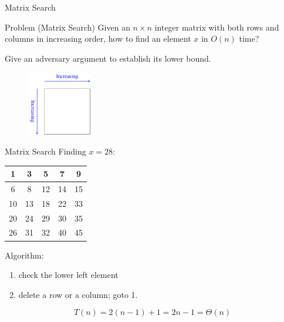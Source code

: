 \documentclass{beamer}
\begin{document}
\begin{frame}{Matrix Search}
  \begin{exampleblock}{Problem (Matrix Search)}
  	Given an $n \times n$ integer matrix with both rows and columns in increasing
  	order, how to find an element $x$ in $O(n)$ time?

	\vspace{0.20cm}

  	Give an adversary argument to establish its lower bound.
  \end{exampleblock}

	  \begin{figure}[htp]
	    \begin{center}
	      \includegraphics[width = 0.25\textwidth]{figure/increasing-matrix.pdf}
	    \end{center}
	  \end{figure}
\end{frame}
\begin{frame}{Matrix Search}
  Finding $x = 28$:
  \begin{table}
	\begin{tabular}{|c|c|c|c|c|}
	  \hline
	  1 	& 3 	& 5 	& 7 	& 9 	\\ \hline
	  6 	& 8 	& 12 	& 14 	& 15  	\\ \hline
	  10 	& 13 	& 18 	& 22 	& 33  	\\ \hline
	  20 	& 24 	& 29 	& 30 	& 35 	\\ \hline
	  26 	& 31 	& 32 	& 40 	& 45 	\\ \hline
	\end{tabular}
  \end{table}

  Algorithm:
  \begin{enumerate}
    \item check the lower left element
    \item delete a row or a column; goto \textcolor{blue!80}{1}.
  \end{enumerate}

  \[ T(n) = 2(n-1) + 1 = 2n - 1 = \Theta(n) \]
\end{frame}
\end{document}
